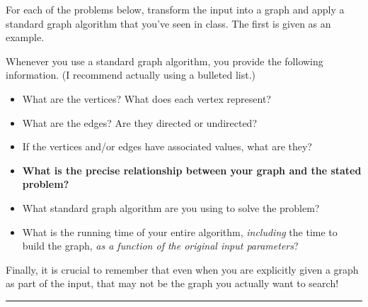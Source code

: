 \documentclass[11pt]{article}
\begin{document}


\noindent 
For each of the problems below, transform the input into a graph and apply a
standard graph algorithm that you’ve seen in class.
The first is given as an example.

Whenever you use a standard
graph algorithm, you  provide the following information.  (I
recommend actually using a bulleted list.)
\begin{itemize}\itemsep0pt
\item What are the vertices?  What does each vertex represent?
\item What are the edges?  Are they directed or undirected?
\item If the vertices and/or edges have associated values, what are they?
\item \textbf{What is the precise relationship between your graph and the stated problem?}
\item What standard graph algorithm are you using to solve the problem?
\item What is the running time of your entire algorithm, \emph{including} the time to build the graph, \emph{as a function of the original input parameters}?
\end{itemize}
Finally, it is crucial to remember that even when you are explicitly given a graph as part of the input, that may not be the graph you actually want to search!

\bigskip
\hrule
\medskip
\end{document}
